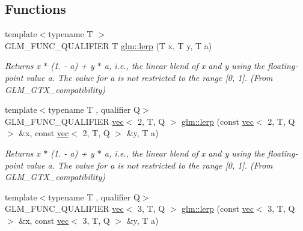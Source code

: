 \subsection*{Functions}
\begin{DoxyCompactItemize}
\item 
\mbox{\label{group__gtx__compatibility_ga5494ba3a95ea6594c86fc75236886864}} 
{\footnotesize template$<$typename T $>$ }\\G\+L\+M\+\_\+\+F\+U\+N\+C\+\_\+\+Q\+U\+A\+L\+I\+F\+I\+ER T \hyperlink{group__gtx__compatibility_ga5494ba3a95ea6594c86fc75236886864}{glm\+::lerp} (T x, T y, T a)
\begin{DoxyCompactList}\small\item\em Returns x $\ast$ (1. -\/ a) + y $\ast$ a, i.\+e., the linear blend of x and y using the floating-\/point value a. The value for a is not restricted to the range \mbox{[}0, 1\mbox{]}. (From G\+L\+M\+\_\+\+G\+T\+X\+\_\+compatibility) \end{DoxyCompactList}\item 
\mbox{\label{group__gtx__compatibility_gaa551c0a0e16d2d4608e49f7696df897f}} 
{\footnotesize template$<$typename T , qualifier Q$>$ }\\G\+L\+M\+\_\+\+F\+U\+N\+C\+\_\+\+Q\+U\+A\+L\+I\+F\+I\+ER \hyperlink{structglm_1_1vec}{vec}$<$ 2, T, Q $>$ \hyperlink{group__gtx__compatibility_gaa551c0a0e16d2d4608e49f7696df897f}{glm\+::lerp} (const \hyperlink{structglm_1_1vec}{vec}$<$ 2, T, Q $>$ \&x, const \hyperlink{structglm_1_1vec}{vec}$<$ 2, T, Q $>$ \&y, T a)
\begin{DoxyCompactList}\small\item\em Returns x $\ast$ (1. -\/ a) + y $\ast$ a, i.\+e., the linear blend of x and y using the floating-\/point value a. The value for a is not restricted to the range \mbox{[}0, 1\mbox{]}. (From G\+L\+M\+\_\+\+G\+T\+X\+\_\+compatibility) \end{DoxyCompactList}\item 
\mbox{\label{group__gtx__compatibility_ga44a8b5fd776320f1713413dec959b32a}} 
{\footnotesize template$<$typename T , qualifier Q$>$ }\\G\+L\+M\+\_\+\+F\+U\+N\+C\+\_\+\+Q\+U\+A\+L\+I\+F\+I\+ER \hyperlink{structglm_1_1vec}{vec}$<$ 3, T, Q $>$ \hyperlink{group__gtx__compatibility_ga44a8b5fd776320f1713413dec959b32a}{glm\+::lerp} (const \hyperlink{structglm_1_1vec}{vec}$<$ 3, T, Q $>$ \&x, const \hyperlink{structglm_1_1vec}{vec}$<$ 3, T, Q $>$ \&y, T a)

\end{DoxyCompactItemize}
